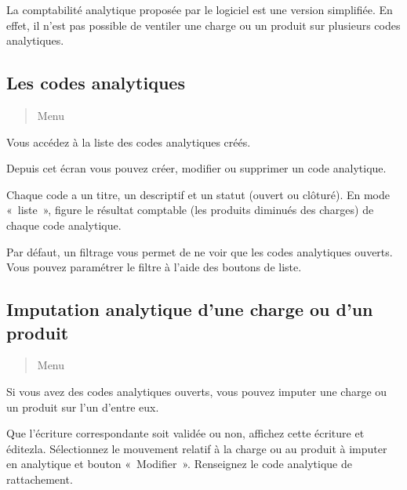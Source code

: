 \documentclass[a4paper,10pt,oneside,french]{sphinxmanual}
\begin{document}
La comptabilité analytique proposée par le logiciel est une version simplifiée. En effet, il n’est pas possible de ventiler une charge ou un produit sur plusieurs codes analytiques.


\subsection{Les codes analytiques}
\label{\detokenize{accounting/costaccounting:les-codes-analytiques}}\begin{quote}

Menu 
\end{quote}

Vous accédez à la liste des codes analytiques créés.

Depuis cet écran vous pouvez créer, modifier ou supprimer un code analytique.

Chaque code a un titre, un descriptif et un statut (ouvert ou clôturé).
En mode « liste », figure le résultat comptable (les produits diminués des charges) de chaque code analytique.
\begin{quote}

\noindent{}
\end{quote}

Par défaut, un filtrage vous permet de ne voir que  les codes analytiques ouverts. Vous pouvez paramétrer le filtre à l’aide des boutons de liste.


\subsection{Imputation analytique d’une charge ou d’un produit}
\label{\detokenize{accounting/costaccounting:imputation-analytique-d-une-charge-ou-d-un-produit}}\begin{quote}

Menu 
\end{quote}

Si vous avez des codes analytiques ouverts, vous pouvez imputer une charge ou un produit sur l’un d’entre eux.
\begin{quote}

\noindent{}
\end{quote}

Que l’écriture correspondante soit validée ou non, affichez cette écriture  et éditez\sphinxhyphen{}la.
Sélectionnez le  mouvement relatif à la charge ou au produit à imputer en analytique et bouton « Modifier ».
Renseignez le code analytique de rattachement.
\end{document}
